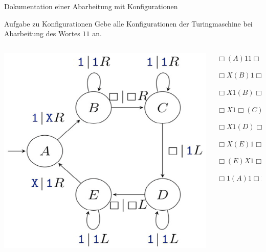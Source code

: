 \documentclass{beamer}
\begin{document}
\begin{frame}{Dokumentation einer Abarbeitung mit Konfigurationen}
	
	\begin{taskblock}{Aufgabe zu Konfigurationen}
		Gebe alle Konfigurationen der Turingmaschine bei Abarbeitung des Wortes $11$ an.
	\end{taskblock}

	\begin{columns}
		\begin{column}{0.25\textwidth}
			\includegraphics[scale=0.3]{images/turingmaschine_1k.png}
		\end{column}
		
		\begin{column}{0.4\textwidth}
			\begin{description}
				\pause\item[] $\Box (A)11 \Box$
				\pause\item[$\rightarrow$] $\Box X(B)1 \Box$
				\pause\item[$\rightarrow$] $\Box X1(B) \Box$
				\pause\item[$\rightarrow$] $\Box X1 \Box (C) \Box$
				\pause\item[$\rightarrow$] $\Box X1 (D) \Box 1\Box$
				\pause\item[$\rightarrow$] $\Box X (E) 1 \Box 1\Box$
				\pause\item[$\rightarrow$] $\Box (E) X 1 \Box 1\Box$
				\pause\item[$\rightarrow$] $\Box 1 (A) 1 \Box 1\Box$
			\end{description}
		\end{column}
	

\end{columns}
\end{frame}
\end{document}
